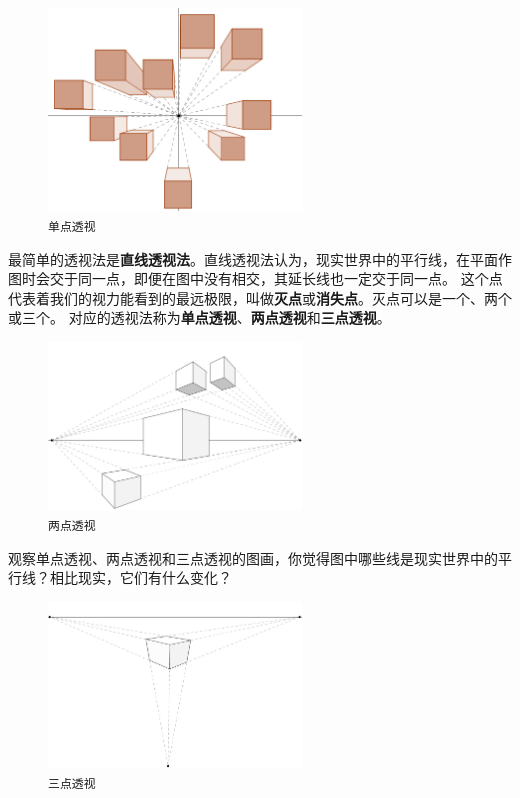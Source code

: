 \documentclass[12pt,UTF8]{ctexbook}
\begin{document}
\begin{figure}[h] %
    \centering
    \includegraphics[width=0.6\textwidth]{单点透视.png}
    \caption*{\texttt{单点透视}}
\end{figure}

最简单的透视法是\textbf{直线透视法}。直线透视法认为，现实世界中的平行线，在平面作图时会交于同一点，即便在图中没有相交，其延长线也一定交于同一点。
这个点代表着我们的视力能看到的最远极限，叫做\textbf{灭点}或\textbf{消失点}。灭点可以是一个、两个或三个。
对应的透视法称为\textbf{单点透视}、\textbf{两点透视}和\textbf{三点透视}。

\begin{figure}[h] %
    \vspace{-4pt}
    \centering
    \includegraphics[width=0.6\textwidth]{两点透视.png}
    \caption*{\texttt{两点透视}}
\end{figure}

观察单点透视、两点透视和三点透视的图画，你觉得图中哪些线是现实世界中的平行线？相比现实，它们有什么变化？

\begin{figure}[h] %
    \vspace{4pt}
    \centering
    \includegraphics[width=0.6\textwidth]{三点透视.png}
    \caption*{\texttt{三点透视}}
\end{figure}
\end{document}
